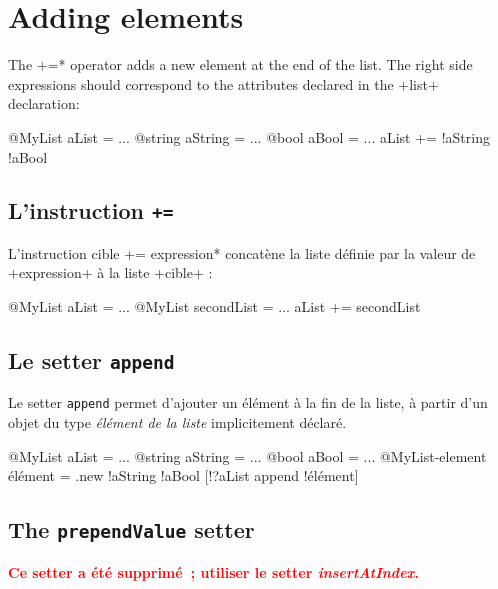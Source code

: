 \section{Adding elements}


The  \ggs*+=* operator adds a new element at the end of the list. The right side expressions should correspond to the attributes declared in the \ggs+list+ declaration:\\

\begin{galgas}
@MyList aList = ...
@string aString = ...
@bool aBool = ...
aList += !aString !aBool
\end{galgas}


\subsection{L'instruction \texttt{+=}}

L'instruction \ggs*cible += expression* concatène la liste définie par la valeur de \ggs+expression+ à la liste \ggs+cible+ :

\begin{galgas}
@MyList aList = ...
@MyList secondList = ...
aList += secondList
\end{galgas}







\subsection{Le setter \texttt{append}}

Le setter \texttt{append} permet d'ajouter un élément à la fin de la liste, à partir d'un objet du type \emph{élément de la liste} implicitement déclaré.


\begin{galgas}
@MyList aList = ... 
@string aString = ... 
@bool aBool = ... 
@MyList-element élément = .new {!aString !aBool}
[!?aList append !élément]
\end{galgas}


\subsection{The \texttt{prependValue} setter}

{\bf \textcolor{red}{Ce setter a été supprimé~; utiliser le setter \emph{insertAtIndex}.}}

